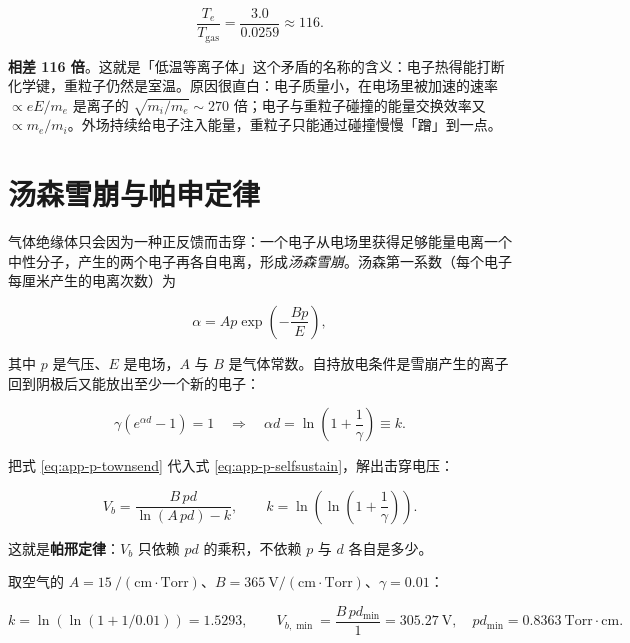 \begin{equation}
  \frac{T_e}{T_{\mathrm{gas}}} = \frac{3.0}{0.0259} \approx 116.
  \label{eq:app-p-noneq}
\end{equation}

\textbf{相差 116 倍}。这就是「低温等离子体」这个矛盾的名称的含义：电子热得能打断化学键，重粒子仍然是室温。原因很直白：电子质量小，在电场里被加速的速率 $\propto eE/m_e$ 是离子的 $\sqrt{m_i/m_e}\sim270$ 倍；电子与重粒子碰撞的能量交换效率又 $\propto m_e/m_i$。外场持续给电子注入能量，重粒子只能通过碰撞慢慢「蹭」到一点。

\section{汤森雪崩与帕申定律}
\label{sec:app-p-paschen}

气体绝缘体只会因为一种正反馈而击穿：一个电子从电场里获得足够能量电离一个中性分子，产生的两个电子再各自电离，形成\emph{汤森雪崩}。汤森第一系数（每个电子每厘米产生的电离次数）为

\begin{equation}
  \alpha = A p \exp\!\left(-\frac{B p}{E}\right),
  \label{eq:app-p-townsend}
\end{equation}

其中 $p$ 是气压、$E$ 是电场，$A$ 与 $B$ 是气体常数。自持放电条件是雪崩产生的离子回到阴极后又能放出至少一个新的电子：

\begin{equation}
  \gamma\left(e^{\alpha d}-1\right) = 1
  \quad\Longrightarrow\quad
  \alpha d = \ln\!\left(1+\frac{1}{\gamma}\right) \equiv k.
  \label{eq:app-p-selfsustain}
\end{equation}

把式 \eqref{eq:app-p-townsend} 代入式 \eqref{eq:app-p-selfsustain}，解出击穿电压：

\begin{equation}
  V_b = \frac{B\,pd}{\ln(A\,pd)-k}, \qquad k = \ln\!\left(\ln\!\left(1+\frac{1}{\gamma}\right)\right).
  \label{eq:app-p-paschen}
\end{equation}

这就是\textbf{帕邢定律}：$V_b$ 只依赖 $pd$ 的乘积，不依赖 $p$ 与 $d$ 各自是多少。

取空气的 $A=15\ \mathrm{/(cm\cdot Torr)}$、$B=365\ \mathrm{V/(cm\cdot Torr)}$、$\gamma=0.01$：

\begin{equation}
  k = \ln\!\left(\ln(1+1/0.01)\right) = 1.5293,
  \qquad
  V_{b,\min} = \frac{B\,pd_{\min}}{1}= 305.27\ \mathrm{V},
  \quad pd_{\min} = 0.8363\ \mathrm{Torr\cdot cm}.
  \label{eq:app-p-paschenmin}
\end{equation}

